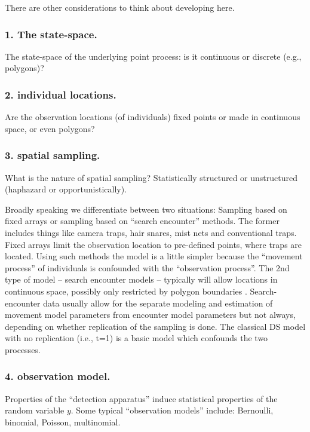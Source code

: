 There are other considerations to think about developing here.

\subsubsection{1. The state-space.}

 The state-space of the
underlying point process: is it continuous or discrete (e.g.,
polygons)?

\subsubsection{2. individual locations.}

Are the observation locations (of individuals) fixed
points or made in continuous space, or even polygons?

\subsubsection{3. spatial sampling.}

What is the nature of spatial sampling?
Statistically structured or unstructured
(haphazard or opportunistically). 

Broadly speaking we differentiate
between two situations: Sampling based on fixed arrays or sampling
based on ``search encounter'' methods. The former includes things like
camera traps, hair snares, mist nets and conventional traps. Fixed
arrays limit the observation location to pre-defined points, where
traps are located. Using such methods the model is a little simpler
because the ``movement process'' of individuals is confounded with the
``observation process''.
The 2nd type of model -- search encounter models -- typically
will allow locations in continuous space, possibly only restricted by
polygon boundaries \citep{royle_young:2008}. 
Search-encounter data
usually allow for the separate modeling and estimation of movement
model parameters from encounter model parameters but not always,
depending on whether replication of the sampling is done.  The
classical DS model with no replication (i.e., t=1) is a basic model
which confounds the two processes.

\subsubsection{4. observation model.}

Properties of the ``detection apparatus'' induce statistical
properties of the random variable $y$. Some typical ``observation
models'' include:
Bernoulli, binomial, Poisson,
multinomial. 


